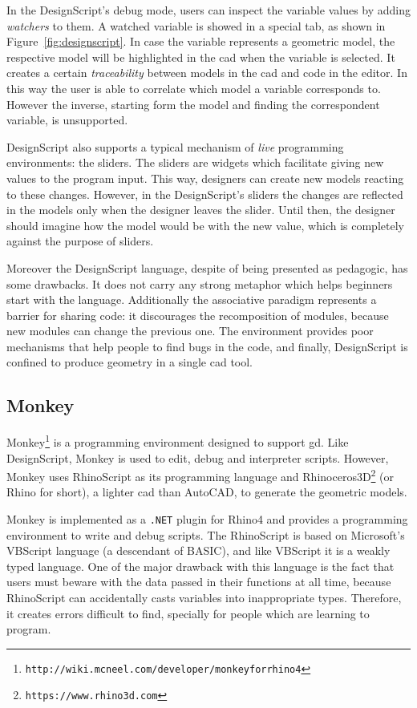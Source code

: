 In the DesignScript's debug mode, users can inspect the variable values by adding \textit{watchers} to them. A watched variable is showed in a special tab, as shown in Figure~\ref{fig:designscript}. In case the variable represents a geometric model, the respective model will be highlighted in the \gls{cad} when the variable is selected. It creates a certain \textit{traceability} between models in the \gls{cad} and code in the editor. In this way the user is able to correlate which model a variable corresponds to. However the inverse, starting form the model and finding the correspondent variable, is unsupported.

DesignScript also supports a typical mechanism of \textit{live} programming environments: the sliders. The sliders are widgets which facilitate giving new values to the program input. This way, designers can create new models reacting to these changes. However, in the DesignScript's sliders the changes are reflected in the models only when the designer leaves the slider. Until then, the designer should imagine how the model would be with the new value, which is completely against the purpose of sliders.

Moreover the DesignScript language, despite of being presented as pedagogic, has some drawbacks. It does not carry any strong metaphor which helps beginners start with the language. Additionally the associative paradigm represents a barrier for sharing code: it discourages the recomposition of modules, because new modules can change the previous one. The environment provides poor mechanisms that help people to find bugs in the code, and finally,  DesignScript is confined to produce geometry in a single \gls{cad} tool.
\subsection{Monkey} 
\label{subsec:monkey}
Monkey\footnote{\texttt{http://wiki.mcneel.com/developer/monkeyforrhino4}} is a programming environment designed to support \gls{gd}. Like DesignScript, Monkey is used to edit, debug and interpreter scripts. However, Monkey uses RhinoScript as its programming language and Rhinoceros3D\footnote{\label{fnote:rhin}\texttt{https://www.rhino3d.com}} (or Rhino for short), a lighter \gls{cad} than AutoCAD, to generate the geometric models.

Monkey is implemented as a \texttt{.NET} plugin for Rhino4 and provides a programming environment to write and debug scripts. The RhinoScript is based on Microsoft's VBScript language (a descendant of BASIC), and like VBScript it is a weakly typed language. One of the major drawback with this language is the fact that users must beware with the data passed in their functions at all time, because RhinoScript can accidentally casts variables into inappropriate types. Therefore, it creates errors difficult to find, specially for people which are learning to program.

